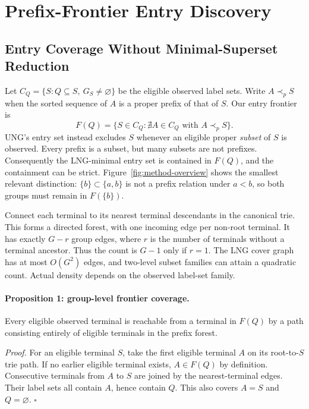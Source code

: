 \section{Prefix-Frontier Entry Discovery}
\label{sec:frontier}
\subsection{Entry Coverage Without Minimal-Superset Reduction}
Let $C_Q=\{S:Q\subseteq S,\ G_S\ne\varnothing\}$ be the eligible observed
label sets.  Write $A\prec_p S$ when the sorted sequence of $A$ is a proper
prefix of that of $S$.  Our entry frontier is
\begin{equation}
 F(Q)=\{S\in C_Q:\nexists A\in C_Q\text{ with }A\prec_p S\}.
\end{equation}
UNG's entry set instead excludes $S$ whenever an eligible proper
\emph{subset} of $S$ is observed.  Every prefix is a subset, but many subsets
are not prefixes.  Consequently the LNG-minimal entry set is contained in
$F(Q)$, and the containment can be strict.  Figure~\ref{fig:method-overview}
shows the smallest relevant distinction: $\{b\}\subset\{a,b\}$ is not a
prefix relation under $a<b$, so both groups must remain in $F(\{b\})$.

Connect each terminal to its nearest terminal descendants in the canonical
trie.  This forms a directed forest, with one incoming edge per non-root
terminal.  It has exactly $G-r$ group edges, where $r$ is the number of
terminals without a terminal ancestor.  Thus the count is $G-1$ only if
$r=1$.  The LNG cover graph has at most $O(G^2)$ edges, and two-level subset
families can attain a quadratic count.  Actual density depends on the observed label-set family.

\paragraph{Proposition 1: group-level frontier coverage.}
Every eligible observed terminal is reachable from a terminal in $F(Q)$ by a
path consisting entirely of eligible terminals in the prefix forest.

\emph{Proof.} For an eligible terminal $S$, take the first eligible terminal
$A$ on its root-to-$S$ trie path.  If no earlier eligible terminal exists,
$A\in F(Q)$ by definition.  Consecutive terminals from $A$ to $S$ are joined
by the nearest-terminal edges.  Their label sets all contain $A$, hence
contain $Q$.  This also covers $A=S$ and $Q=\varnothing$. \hfill$\square$

